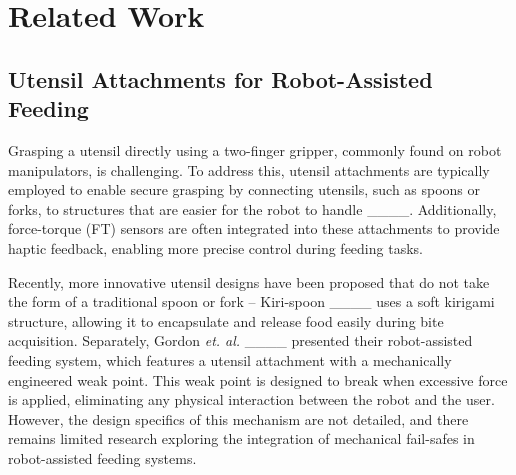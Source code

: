 \section{Related Work}
\subsection{Utensil Attachments for Robot-Assisted Feeding}
Grasping a utensil directly using a two-finger gripper, commonly found on robot manipulators, is challenging. To address this, utensil attachments are typically employed to enable secure grasping by connecting utensils, such as spoons or forks, to structures that are easier for the robot to handle ____. Additionally, force-torque (FT) sensors are often integrated into these attachments to provide haptic feedback, enabling more precise control during feeding tasks. 

Recently, more innovative utensil designs have been proposed that do not take the form of a traditional spoon or fork -- Kiri-spoon ____ uses a soft kirigami structure, allowing it to encapsulate and release food easily during bite acquisition. Separately, Gordon \textit{et. al.} ____ presented their robot-assisted feeding system, which features a utensil attachment with a mechanically engineered weak point. This weak point is designed to break when excessive force is applied, eliminating any physical interaction between the robot and the user. However, the design specifics of this mechanism are not detailed, and there remains limited research exploring the integration of mechanical fail-safes in robot-assisted feeding systems.




